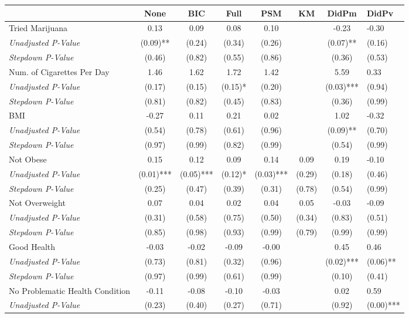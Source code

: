 \begin{tabular}{l c c c c c c}
\toprule
 & None & BIC & Full & PSM & KM & DidPm & DidPv \\
\midrule
Tried Marijuana & 0.13 & 0.09 & 0.08 & 0.10 & & -0.23 & -0.30 \\
\quad \textit{Unadjusted P-Value} & (0.09)** & (0.24) & (0.34) & (0.26) & & (0.07)** & (0.16) \\
\quad \textit{Stepdown P-Value} & (0.46) & (0.82) & (0.55) & (0.86) & & (0.36) & (0.53) \\
Num. of Cigarettes Per Day & 1.46 & 1.62 & 1.72 & 1.42 & & 5.59 & 0.33 \\
\quad \textit{Unadjusted P-Value} & (0.17) & (0.15) & (0.15)* & (0.20) & & (0.03)*** & (0.94) \\
\quad \textit{Stepdown P-Value} & (0.81) & (0.82) & (0.45) & (0.83) & & (0.36) & (0.99) \\
BMI & -0.27 & 0.11 & 0.21 & 0.02 & & 1.02 & -0.32 \\
\quad \textit{Unadjusted P-Value} & (0.54) & (0.78) & (0.61) & (0.96) & & (0.09)** & (0.70) \\
\quad \textit{Stepdown P-Value} & (0.97) & (0.99) & (0.82) & (0.99) & & (0.54) & (0.99) \\
Not Obese & 0.15 & 0.12 & 0.09 & 0.14 & 0.09 & 0.19 & -0.10 \\
\quad \textit{Unadjusted P-Value} & (0.01)*** & (0.05)*** & (0.12)* & (0.03)*** & (0.29) & (0.18) & (0.46) \\
\quad \textit{Stepdown P-Value} & (0.25) & (0.47) & (0.39) & (0.31) & (0.78) & (0.54) & (0.99) \\
Not Overweight & 0.07 & 0.04 & 0.02 & 0.04 & 0.05 & -0.03 & -0.09 \\
\quad \textit{Unadjusted P-Value} & (0.31) & (0.58) & (0.75) & (0.50) & (0.34) & (0.83) & (0.51) \\
\quad \textit{Stepdown P-Value} & (0.85) & (0.98) & (0.93) & (0.99) & (0.79) & (0.99) & (0.99) \\
Good Health & -0.03 & -0.02 & -0.09 & -0.00 & & 0.45 & 0.46 \\
\quad \textit{Unadjusted P-Value} & (0.73) & (0.81) & (0.32) & (0.96) & & (0.02)*** & (0.06)** \\
\quad \textit{Stepdown P-Value} & (0.97) & (0.99) & (0.61) & (0.99) & & (0.10) & (0.41) \\
No Problematic Health Condition & -0.11 & -0.08 & -0.10 & -0.03 & & 0.02 & 0.59 \\
\quad \textit{Unadjusted P-Value} & (0.23) & (0.40) & (0.27) & (0.71) & & (0.92) & (0.00)*** \\

\end{tabular}
